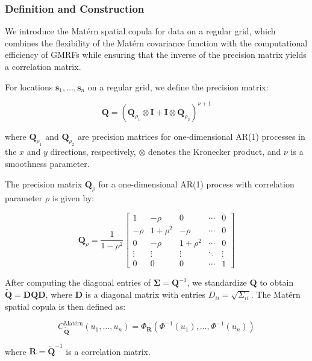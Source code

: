 \subsubsection{Definition and Construction}
We introduce the Matérn spatial copula for data on a regular grid, which combines the flexibility of the Matérn covariance function with the computational efficiency of GMRFs while ensuring that the inverse of the precision matrix yields a correlation matrix.

For locations $\mathbf{s}_1, \ldots, \mathbf{s}_n$ on a regular grid, we define the precision matrix:

\begin{equation}
\mathbf{Q} = (\mathbf{Q}_{\rho_1} \otimes \mathbf{I} + \mathbf{I} \otimes \mathbf{Q}_{\rho_2})^{\nu+1}
\end{equation}

where $\mathbf{Q}_{\rho_1}$ and $\mathbf{Q}_{\rho_2}$ are precision matrices for one-dimensional AR(1) processes in the $x$ and $y$ directions, respectively, $\otimes$ denotes the Kronecker product, and $\nu$ is a smoothness parameter.

The precision matrix $\mathbf{Q}_{\rho}$ for a one-dimensional AR(1) process with correlation parameter $\rho$ is given by:

\begin{equation}
\mathbf{Q}_{\rho} = \frac{1}{1-\rho^2}
\begin{bmatrix}
1 & -\rho & 0 & \cdots & 0 \\
-\rho & 1+\rho^2 & -\rho & \cdots & 0 \\
0 & -\rho & 1+\rho^2 & \cdots & 0 \\
\vdots & \vdots & \vdots & \ddots & \vdots \\
0 & 0 & 0 & \cdots & 1
\end{bmatrix}
\end{equation}

After computing the diagonal entries of $\mathbf{\Sigma} = \mathbf{Q}^{-1}$, we standardize $\mathbf{Q}$ to obtain $\tilde{\mathbf{Q}} = \mathbf{D}\mathbf{Q}\mathbf{D}$, where $\mathbf{D}$ is a diagonal matrix with entries $D_{ii} = \sqrt{\Sigma_{ii}}$. The Matérn spatial copula is then defined as:

\begin{equation}
C_{\tilde{\mathbf{Q}}}^{\text{Matérn}}(u_1, \ldots, u_n) = \Phi_{\mathbf{R}}(\Phi^{-1}(u_1), \ldots, \Phi^{-1}(u_n))
\end{equation}

where $\mathbf{R} = \tilde{\mathbf{Q}}^{-1}$ is a correlation matrix.

